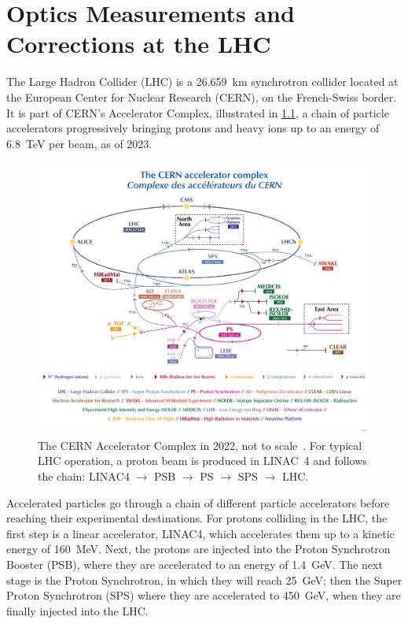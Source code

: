 \chapter{Optics Measurements and Corrections at the LHC}
\label{Chapter:LHC_OMC} %

The Large Hadron Collider (LHC) is a \qty{26.659}{\kilo\metre} synchrotron collider located at the European Center for Nuclear Research (CERN), on the French-Swiss border.
It is part of CERN's Accelerator Complex, illustrated in \cref{figure:cern_accelerator_complex}, a chain of particle accelerators progressively bringing protons and heavy ions up to an energy of \qty{6.8}{\tera\electronvolt} per beam, as of \num{2023}.

\begin{figure}[!htb]
  \centering
  \includegraphics*[width=0.9\linewidth]{Figures/Optics_Measurements_Corrections_at_LHC/cern_accelerator_complex.png}
  \caption{The CERN Accelerator Complex in \num{2022}, not to scale~\cite{Website:CERN_Accelerator_Complex_Resource}. For typical LHC operation, a proton beam is produced in \(\mathrm{LINAC}\)~\num{4} and follows the chain: \(\mathrm{LINAC}\)\num{4} \(\rightarrow\) \(\mathrm{PSB}\) \(\rightarrow\) \(\mathrm{PS}\) \(\rightarrow\) \(\mathrm{SPS}\) \(\rightarrow\) \(\mathrm{LHC}\).}
  \label{figure:cern_accelerator_complex}
\end{figure}

Accelerated particles go through a chain of different particle accelerators before reaching their experimental destinations.
For protons colliding in the LHC, the first step is a linear accelerator, LINAC\num{4}, which accelerates them up to a kinetic energy of \qty{160}{\mega\electronvolt}.
Next, the protons are injected into the Proton Synchrotron Booster (PSB), where they are accelerated to an energy of \qty{1.4}{\giga\electronvolt}.
The next stage is the Proton Synchrotron, in which they will reach \qty{25}{\giga\electronvolt}; then the Super Proton Synchrotron (SPS) where they are accelerated to \qty{450}{\giga\electronvolt}, when they are finally injected into the LHC.

